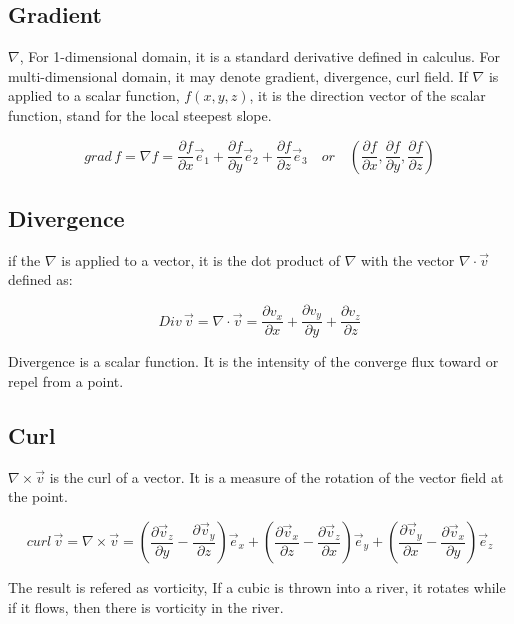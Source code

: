 \documentclass{article}
\begin{document}
\subsection{Gradient} 
$\nabla$,  For 1-dimensional domain, it is a standard derivative defined in calculus. 
For multi-dimensional domain, it may denote gradient, divergence, curl field. 
If $\nabla$ is applied to a scalar function, $f(x, y, z)$, it is the direction vector of the scalar function, stand for the local steepest slope.

\begin{equation}
grad \, f = \nabla f = \frac{\partial f}{\partial x} \vec e_1+\frac{\partial f}{\partial y} \vec e_2 +\frac{\partial f}{\partial z}\vec e_3 \quad or \quad \left( \frac{\partial f}{\partial x},\frac{\partial f}{\partial y},\frac{\partial f}{\partial z} \right)
\end{equation}

\subsection{Divergence} 
if the $\nabla$ is applied to a vector, it is the dot product of $\nabla$ with the vector $\nabla \cdot \vec{v}$ defined as: 

\begin{equation}
Div\, \vec v=\nabla \cdot \vec v = \frac{\partial v_x}{\partial x} +  \frac{\partial v_y}{\partial y}+\frac{\partial v_z}{\partial z}
\end{equation}

Divergence is a scalar function. It is the intensity of the converge flux toward or repel from a point. 

\subsection{Curl} 
$\nabla \times \vec{v}$ is the curl of a vector. It is a measure of the rotation of the vector field at the point. 

\begin{equation}
curl \, \vec v=\nabla \times \vec v=(\frac{\partial \vec v_z}{\partial y} - \frac{\partial \vec v_y}{\partial z})\vec e_x+(\frac{\partial \vec v_x}{\partial z} - \frac{\partial \vec v_z}{\partial x})\vec e_y+(\frac{\partial \vec v_y}{\partial x} - \frac{\partial \vec v_x}{\partial y})\vec e_z
\end{equation}

The result is refered as vorticity, If a cubic is thrown into a river, it rotates while if it flows, then there is vorticity in the river. 
\end{document}
